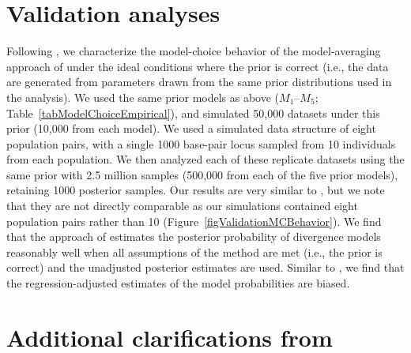 \section{Validation analyses}
Following \citet{Oaks2012}, we characterize the model-choice behavior of the
model-averaging approach of \citet{Hickerson2013} under the ideal conditions
where the prior is correct (i.e., the data are generated from parameters drawn
from the same prior distributions used in the analysis).
We used the same prior models as above ($M_1$--$M_5$;
Table~\ref{tabModelChoiceEmpirical}), and simulated 50,000 datasets under this
prior (10,000 from each model).
We used a simulated data structure of eight population pairs, with a single
1000 base-pair locus sampled from 10 individuals from each population.
We then analyzed each of these replicate datasets using the same prior with 2.5
million samples (500,000 from each of the five prior models), retaining 1000
posterior samples.
Our results are very similar to \citet{Oaks2012}, but we note that they
are not directly comparable as our simulations contained eight population
pairs rather than 10 (Figure~\ref{figValidationMCBehavior}).
We find that the approach of \citet{Hickerson2013} estimates the posterior
probability of divergence models reasonably well when all assumptions of the
method are met (i.e., the prior is correct) and the unadjusted posterior
estimates are used.
Similar to \cite{Oaks2012}, we find that the regression-adjusted estimates of
the model probabilities are biased.

\section{Additional clarifications from \citet{Hickerson2013}}

